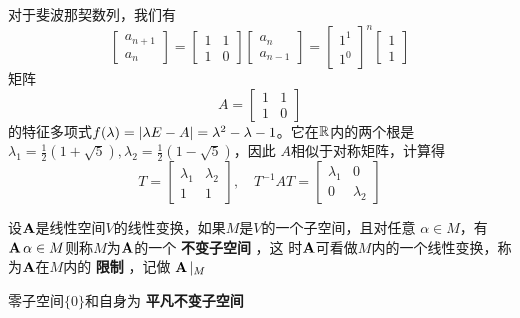 \documentclass[11pt]{article}
\begin{document}
\begin{examplle}[]
对于斐波那契数列，我们有
\begin{equation*}
\begin{bmatrix}
a_{n+1}\\a_n
\end{bmatrix}=
\begin{bmatrix}
1&1\\1&0
\end{bmatrix}
\begin{bmatrix}
a_n\\a_{n-1}
\end{bmatrix}=
\begin{bmatrix}
1^1\\1^0
\end{bmatrix}^n
\begin{bmatrix}
1\\1
\end{bmatrix}
\end{equation*}
矩阵
\begin{equation*}
A=
\begin{bmatrix}
1&1\\1&0
\end{bmatrix}
\end{equation*}
的特征多项式\(f(\lambda)=\abs{\lambda E-A}=\lambda^2-\lambda-1\)。它在\(\mathbb{R}\)内的两个根是
\(\lambda_1=\frac{1}{2}(1+\sqrt{5}),\lambda_2=\frac{1}{2}(1-\sqrt{5})\)，因此
\(A\)相似于对称矩阵，计算得
\begin{equation*}
T=
\begin{bmatrix}
\lambda_1&\lambda_2\\1&1
\end{bmatrix},\quad
T^{-1}AT=
\begin{bmatrix}
\lambda_1&0\\0&\lambda_2
\end{bmatrix}
\end{equation*}
\end{examplle}

\begin{definition}[]
设\(\operatorname{\textbf{A}}\)是线性空间\(V\)的线性变换，如果\(M\)是\(V\)的一个子空间，且对任意
\(\alpha\in M\)，有\(\operatorname{\textbf{A}}\alpha\in M\)则称\(M\)为\(\operatorname{\textbf{A}}\)的一个 \textbf{不变子空间} ，这
时\(\operatorname{\textbf{A}}\)可看做\(M\)内的一个线性变换，称为\(\operatorname{\textbf{A}}\)在\(M\)内的 \textbf{限制} ，记做
\(\operatorname{\textbf{A}}|_{M}\)

零子空间\(\{0\}\)和自身为 \textbf{平凡不变子空间}
\end{definition}
\end{document}
